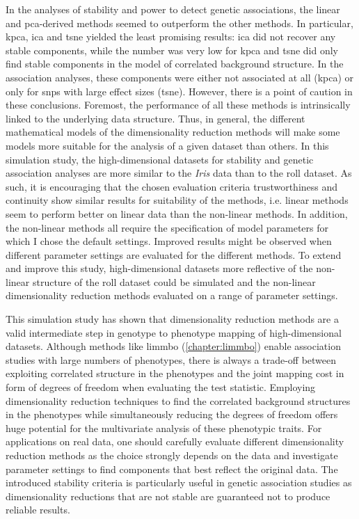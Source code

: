 In the analyses of stability and power to detect genetic associations, the linear and \gls{pca}-derived methods seemed to outperform the other methods. In particular, \gls{kpca}, \gls{ica} and \gls{tsne} yielded the least promising results: \gls{ica} did not recover any stable components, while the number was very low for \gls{kpca} and \gls{tsne} did only find stable components in the model of correlated background structure. In the association analyses, these components were either not associated at all (\gls{kpca}) or only for \glspl{snp} with large effect sizes (\gls{tsne}). However, there is a point of caution in these conclusions. Foremost, the performance of all these methods is intrinsically linked to the underlying data structure. Thus, in general, the different mathematical models of the dimensionality reduction methods will make some models more suitable for the analysis of a given dataset than others. In this simulation study, the high-dimensional datasets for stability and genetic association analyses are more similar to the \textit{Iris} data than to the roll dataset. As such, it is encouraging that the chosen evaluation criteria trustworthiness and continuity show similar results for suitability of the methods, i.e. linear methods seem to perform better on linear data than the non-linear methods. In addition, the non-linear methods all require the specification of model parameters for which I chose the default settings. Improved results might be observed when different parameter settings are evaluated for the different methods. To extend and improve this study, high-dimensional datasets more reflective of the non-linear structure of the roll dataset could be simulated and the non-linear dimensionality reduction methods evaluated on a range of parameter settings. 

This simulation study has shown that dimensionality reduction methods are a valid intermediate step in genotype to phenotype mapping of high-dimensional datasets. Although methods like \gls{limmbo} (\cref{chapter:limmbo}) enable association studies with large numbers of phenotypes, there is always a trade-off between exploiting correlated structure in the phenotypes and the joint mapping cost in form of degrees of freedom when evaluating the test statistic. Employing dimensionality reduction techniques to find the correlated background structures in the phenotypes while simultaneously reducing the degrees of freedom offers huge potential for the multivariate analysis of these phenotypic traits. For applications on real data, one should carefully evaluate different dimensionality reduction methods as the choice strongly depends on the data and investigate parameter settings to find components that best reflect the original data. The introduced stability criteria is particularly useful in genetic association studies as dimensionality reductions that are not stable are guaranteed not to produce reliable results.



